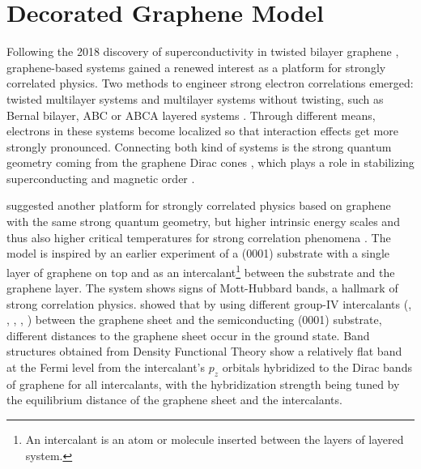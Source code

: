 \documentclass[../main.tex]{subfiles}
\begin{document}
\chapter{Decorated Graphene Model}\label{ch:decorated graphene model}

Following the 2018 discovery of superconductivity in twisted bilayer graphene \cite{caoUnconventionalSuperconductivityMagicangle2018}, graphene-based systems gained a renewed interest as a platform for strongly correlated physics.
Two methods to engineer strong electron correlations emerged: twisted multilayer systems  \cite{caoUnconventionalSuperconductivityMagicangle2018, tanakaSuperfluidStiffnessMagicangle2025, tormaSuperconductivitySuperfluidityQuantum2022, andreiGrapheneBilayersTwist2020, xieTopologyBoundedSuperfluidWeight2020} and multilayer systems without twisting, such as Bernal bilayer, ABC or ABCA layered systems \cite{pantaleonSuperconductivityCorrelatedPhases2023}.
Through different means, electrons in these systems become localized so that interaction effects get more strongly pronounced.
Connecting both kind of systems is the strong quantum geometry coming from the graphene Dirac cones \cite{wehlingDiracMaterials2014}, which plays a role in stabilizing superconducting \cite{liangBandGeometryBerry2017, tanakaSuperfluidStiffnessMagicangle2025} and magnetic order \cite{abouelkomsanQuantumMetricInduced2023, liuOrbitalMagneticStates2021}.

\citeauthor{wittQuantumGeometryLocal2025} suggested another platform for strongly correlated physics based on graphene with the same strong quantum geometry, but higher intrinsic energy scales and thus also higher critical temperatures for strong correlation phenomena \cite{wittQuantumGeometryLocal2025}.
The model is inspired by an earlier experiment \cite{ghosalElectronicCorrelationsEpitaxial2024} of a (0001) substrate with a single layer of graphene on top and  as an intercalant\footnote{An intercalant is an atom or molecule inserted between the layers of layered system.} between the substrate and the graphene layer.
The system shows signs of Mott-Hubbard bands, a hallmark of strong correlation physics.
\citeauthor{wittQuantumGeometryLocal2025} showed that by using different group-IV intercalants (, , , , ) between the graphene sheet and the semiconducting (0001) substrate, different distances to the graphene sheet occur in the ground state.
Band structures obtained from Density Functional Theory show a relatively flat band at the Fermi level from the intercalant’s \(p_z\) orbitals hybridized to the Dirac bands of graphene for all intercalants, with the hybridization strength being tuned by the equilibrium distance of the graphene sheet and the intercalants.
\end{document}
